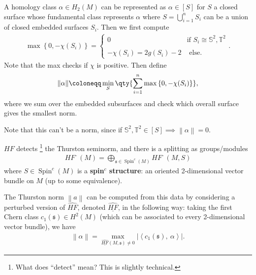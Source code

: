 \begin{definition}

A homology class \(\alpha\in H_2(M)\) can be represented as
\(\alpha\in [S]\) for \(S\) a closed surface whose fundamental class
represents \(\alpha\) where \(S = \bigcup_{i=1}^n S_i\) can be a union
of closed embedded surfaces \(S_i\). Then we first compute
\begin{align*}
\max\left\{{0, - \chi(S_i) }\right\} 
=
\begin{cases}
0 & \text{if } S_i \cong {\mathbb{S}}^2, {\mathbb{T}}^2 \\ 
\\
- \chi(S_i) = 2g(S_i) - 2  & \text{ else} .
\end{cases}
.\end{align*}
Note that the max checks if \(\chi\) is positive. Then define
\begin{align*}
{\left\lVert { \alpha } \right\rVert} \coloneqq\min_S \qty{ \sum_{i=1}^n 
\max\left\{{0, - \chi(S_i) }\right\} }
,\end{align*}
where we sum over the embedded subsurfaces and check which overall
surface gives the smallest norm.

\end{definition}

\begin{remark}

Note that this can't be a norm, since if
\({\mathbb{S}}^2, {\mathbb{T}}^2 \in [S] \implies {\left\lVert {\alpha } \right\rVert}= 0\).

\end{remark}

\begin{theorem}

\(HF\) detects \footnote{What does ``detect'' mean? This is slightly
  technical.} the Thurston seminorm, and there is a splitting as
groups/modules
\begin{align*}
HF^{\,\cdot\,}(M) = \bigoplus _{\mathfrak{s} \in {\operatorname{Spin}}^c(M)} HF^{\,\cdot\,}(M, S) 
\end{align*}
where \(S \in {\operatorname{Spin}}^c(M)\) is a \textbf{spin\(^c\)
structure}: an oriented 2-dimensional vector bundle on \(M\) (up to some
equivalence).

\end{theorem}

\begin{remark}

The Thurston norm \({\left\lVert {a} \right\rVert}\) can be computed
from this data by considering a perturbed version of \(\widehat{HF}\),
denoted \(\underline{\widehat{HF}}\), in the following way: taking the
first Chern class \(c_1(\mathfrak{s}) \in H^2(M)\) (which can be
associated to every 2-dimensional vector bundle), we have
\begin{align*}
{\left\lVert { \alpha} \right\rVert} = \max_{\underline{\widehat{HF}}(M, \mathfrak{s}  ) \neq 0 }
{\left\lvert {{\left\langle { c_1(\mathfrak{s})  },~{ \alpha } \right\rangle}  } \right\rvert}
.\end{align*}

\end{remark}

